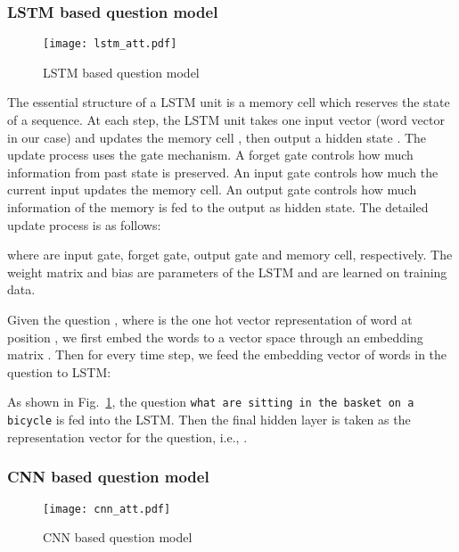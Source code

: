 \documentclass[10pt,twocolumn,letterpaper]{article}
\begin{document}
\vspace{-0.2cm}
\subsubsection{LSTM based question model}
\label{sec:question_lstm}
\begin{figure}[tbh]
  \vspace{-0.6cm}
  \texttt{[image: lstm\_att.pdf]}
  \centering
  \caption{LSTM based question model}
  \label{fig:lstm}
  \vspace{-0.2cm}
\end{figure}

The essential structure of a LSTM unit is a memory cell  which reserves
the state of a sequence. At each step, the LSTM unit takes one input vector
(word vector in our case)  and updates the memory cell , then
output a hidden state . The update process uses the gate mechanism. A
forget gate  controls how much information from past state  is
preserved. An input gate  controls how much the current input 
updates the memory cell. An output gate  controls how much information
of the memory is fed to the output as hidden state. The detailed update process
is as follows:

where  are input gate, forget gate, output gate and memory cell,
respectively. The weight matrix and bias are parameters of the LSTM and are
learned on training data.

Given the question , where  is the one hot vector
representation of word at position , we first embed the words to a vector
space through an embedding matrix . Then for every time
step, we feed the embedding vector of words in the question to LSTM:


As shown in Fig.~\ref{fig:lstm}, the question \texttt{what are sitting in the
  basket on a bicycle} is fed into the LSTM. Then the final hidden layer is
taken as the representation vector for the question, i.e., .

\subsubsection{CNN based question model}
\label{sec:question_cnn}
\begin{figure}[tbh]
  \vspace{-0.3cm}
  \texttt{[image: cnn\_att.pdf]}
  \centering
  \caption{CNN based question model}
  \label{fig:cnn}
  \vspace{-0.3cm}
\end{figure}
\end{document}

